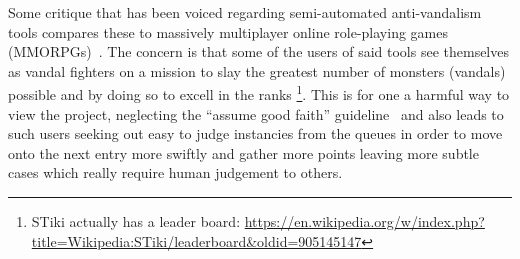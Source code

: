 Some critique that has been voiced regarding semi-automated anti-vandalism tools compares these to massively multiplayer online role-playing games (MMORPGs)~\cite{HalRied2012}.
The concern is that some of the users of said tools see themselves as vandal fighters on a mission to slay the greatest number of monsters (vandals) possible and by doing so to excell in the ranks
\footnote{STiki actually has a leader board: \url{https://en.wikipedia.org/w/index.php?title=Wikipedia:STiki/leaderboard&oldid=905145147}}.
This is for one a harmful way to view the project, neglecting the ``assume good faith'' guideline~\cite{Wikipedia:GoodFaith}
and also leads to such users seeking out easy to judge instancies from the queues in order to move onto the next entry more swiftly and gather more points
leaving more subtle cases which really require human judgement to others.

